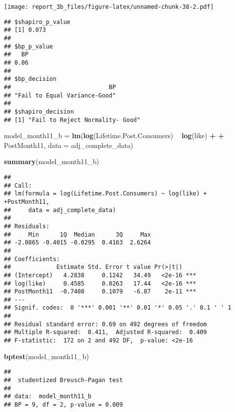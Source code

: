 \documentclass[
]{article}
\newenvironment{Shaded}{\begin{snugshade}}{\end{snugshade}}
\newcommand{\DataTypeTok}[1]{\textcolor[rgb]{0.13,0.29,0.53}{#1}}
\newcommand{\KeywordTok}[1]{\textcolor[rgb]{0.13,0.29,0.53}{\textbf{#1}}}
\newcommand{\NormalTok}[1]{#1}
\newcommand{\OperatorTok}[1]{\textcolor[rgb]{0.81,0.36,0.00}{\textbf{#1}}}
\newcommand{\StringTok}[1]{\textcolor[rgb]{0.31,0.60,0.02}{#1}}
\begin{document}
\texttt{[image: report\_3b\_files/figure-latex/unnamed-chunk-38-2.pdf]}

\begin{verbatim}
## $shapiro_p_value
## [1] 0.073
## 
## $bp_p_value
##   BP 
## 0.06 
## 
## $bp_decision
##                            BP 
## "Fail to Equal Variance-Good" 
## 
## $shapiro_decision
## [1] "Fail to Reject Normality- Good"
\end{verbatim}

\begin{Shaded}
\begin{Highlighting}[]
\NormalTok{model_month11_b =}\StringTok{ }\KeywordTok{lm}\NormalTok{(}\KeywordTok{log}\NormalTok{(Lifetime.Post.Consumers) }\OperatorTok{~}\StringTok{   }\KeywordTok{log}\NormalTok{(like) }\OperatorTok{+}\StringTok{  }
\StringTok{                 }\OperatorTok{+}\StringTok{ }\NormalTok{PostMonth11, }\DataTypeTok{data =}\NormalTok{ adj_complete_data)}

\KeywordTok{summary}\NormalTok{(model_month11_b)}
\end{Highlighting}
\end{Shaded}

\begin{verbatim}
## 
## Call:
## lm(formula = log(Lifetime.Post.Consumers) ~ log(like) + +PostMonth11, 
##     data = adj_complete_data)
## 
## Residuals:
##     Min      1Q  Median      3Q     Max 
## -2.0865 -0.4015 -0.0295  0.4163  2.6264 
## 
## Coefficients:
##             Estimate Std. Error t value Pr(>|t|)    
## (Intercept)   4.2838     0.1242   34.49   <2e-16 ***
## log(like)     0.4585     0.0263   17.44   <2e-16 ***
## PostMonth11  -0.7408     0.1079   -6.87    2e-11 ***
## ---
## Signif. codes:  0 '***' 0.001 '**' 0.01 '*' 0.05 '.' 0.1 ' ' 1
## 
## Residual standard error: 0.69 on 492 degrees of freedom
## Multiple R-squared:  0.411,  Adjusted R-squared:  0.409 
## F-statistic:  172 on 2 and 492 DF,  p-value: <2e-16
\end{verbatim}

\begin{Shaded}
\begin{Highlighting}[]
\KeywordTok{bptest}\NormalTok{(model_month11_b)}
\end{Highlighting}
\end{Shaded}

\begin{verbatim}
## 
##  studentized Breusch-Pagan test
## 
## data:  model_month11_b
## BP = 9, df = 2, p-value = 0.009
\end{verbatim}
\end{document}
